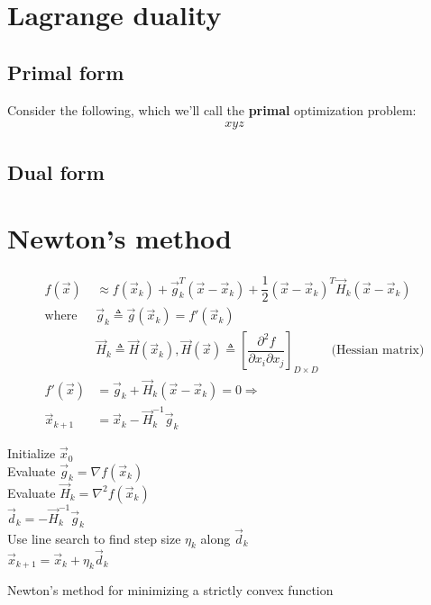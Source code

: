 \section{Lagrange duality}


\subsection{Primal form}
Consider the following, which we'll call the \textbf{primal} optimization problem:
\begin{eqnarray}
xyz
\end{eqnarray}


\subsection{Dual form}


\section{Newton's method}
\label{sec:Newtons-method}
\begin{align}
f(\vec{x})& \approx f(\vec{x}_k)+\vec{g}_k^T(\vec{x}-\vec{x}_k)+\dfrac{1}{2}(\vec{x}-\vec{x}_k)^T\vec{H}_k(\vec{x}-\vec{x}_k) \nonumber \\
\text{where } & \vec{g}_k \triangleq \vec{g}(\vec{x}_k)=f'(\vec{x}_k) \nonumber \\
              & \vec{H}_k \triangleq \vec{H}(\vec{x}_k), \vec{H}(\vec{x}) \triangleq \left[\dfrac{\partial^2 f}{\partial x_i \partial x_j}\right]_{D \times D} \quad \text{(Hessian matrix)} \nonumber \\
f'(\vec{x})& = \vec{g}_k+\vec{H}_k(\vec{x}-\vec{x}_k)=0 \Rightarrow  \label{eqn:newton-stationary-point} \\
\vec{x}_{k+1}& = \vec{x}_k-\vec{H}_k^{-1}\vec{g}_k
\end{align}

\begin{algorithm}[htbp]
    Initialize $\vec{x}_0$ \\
	
	 {
        Evaluate $\vec{g}_k=\nabla f(\vec{x}_k)$ \\
        Evaluate $\vec{H}_k=\nabla^2 f(\vec{x}_k)$ \\
        $\vec{d}_k=-\vec{H}_k^{-1}\vec{g}_k$ \\
        Use line search to find step size $\eta_k$ along $\vec{d}_k$ \\
        $\vec{x}_{k+1}=\vec{x}_k+\eta_k\vec{d}_k$
	}
	
\caption{Newton’s method for minimizing a strictly convex function}
\end{algorithm}


